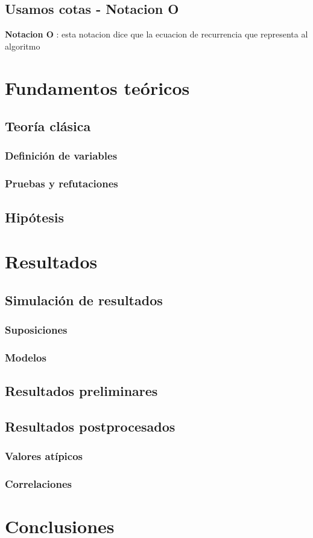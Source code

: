 \documentclass[12pt]{book}
\begin{document}
\section{Usamos cotas - Notacion O}
\textbf{Notacion O} : esta notacion dice que la ecuacion de recurrencia que representa  al algoritmo 

\chapter{Fundamentos teóricos}
\section{Teoría clásica}
\subsection{Definición de variables}
\subsection{Pruebas y refutaciones}
\section{Hipótesis}
\chapter{Resultados}
\section{Simulación de resultados}
\subsection{Suposiciones}
\subsection{Modelos}
\section{Resultados preliminares}
\section{Resultados postprocesados}
\subsection{Valores atípicos}
\subsection{Correlaciones}
\chapter{Conclusiones}
\end{document}
